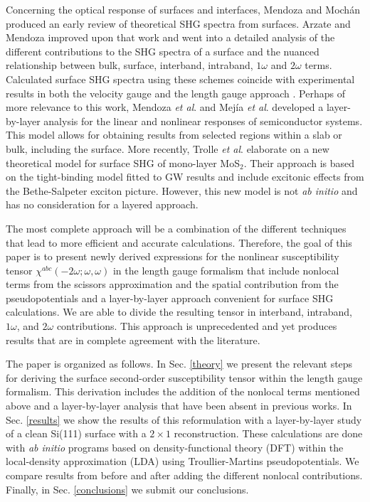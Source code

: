 \documentclass[floatfix,prb,aps,superscriptaddress,11pt,preprint,letterpaper]{revtex4}
\begin{document}
Concerning the optical response of surfaces and interfaces,
Mendoza and Moch\'an\cite{mendozaPRB96a} produced an early review of 
theoretical SHG spectra from surfaces. 
Arzate and Mendoza\cite{arzatePRB01} improved upon that work and
went into a detailed analysis of the different contributions to the 
SHG spectra of a surface and the nuanced relationship between bulk, 
surface, interband, intraband, $1\omega$ and $2\omega$ terms. 
Calculated surface SHG spectra using these schemes coincide with experimental
results in both the velocity gauge
\cite{mendozaPRB01,mendozaPRL98,reiningPRB94} and the length gauge approach
\cite{sharmaPRB03}. 
Perhaps of more relevance to this work, 
Mendoza \emph{et al}.\cite{mendozaPRB06} and 
Mej\'ia \emph{et al}.\cite{mejiaRMF04} developed a layer-by-layer analysis for 
the linear and nonlinear responses of semiconductor systems. This model
allows for obtaining results from selected regions within a slab or bulk,
including the surface.
More recently, 
Trolle \emph{et al}.\cite{trollePRB14} 
elaborate on a new theoretical model for surface SHG of 
mono-layer MoS$_{2}$. Their approach is based on the tight-binding model 
fitted to GW results and include excitonic effects from the 
Bethe-Salpeter exciton picture. However, this new model is not 
\emph{ab initio} and has no consideration for a layered approach.

The most complete approach will be a combination of the different techniques 
that lead to more efficient and accurate calculations. Therefore,
the goal of this paper is to present newly derived expressions for the 
nonlinear susceptibility tensor $\chi^{abc}(-2\omega;\omega,\omega)$ 
in the length gauge formalism
that include nonlocal terms from the scissors approximation 
and the spatial contribution from the pseudopotentials and a 
layer-by-layer approach convenient for surface SHG calculations. We are
able to divide the resulting tensor in interband, intraband, $1\omega$, and 
$2\omega$ contributions. This approach is unprecedented and yet produces 
results that are in complete agreement with the literature.

The paper is organized as follows. 
In Sec. \ref{theory} we present the 
relevant steps for deriving the surface second-order susceptibility tensor 
within the length gauge formalism. This derivation includes the addition of 
the nonlocal terms mentioned above and a layer-by-layer analysis that have 
been absent in previous works. 
In Sec. \ref{results} we show the results of this 
reformulation with a layer-by-layer study of a clean Si(111) surface with a 
$2 \times 1$ reconstruction. These calculations are done with \emph{ab initio}
programs based on density-functional theory (DFT) within the local-density 
approximation (LDA) using Troullier-Martins pseudopotentials. We compare 
results from before and after adding the different nonlocal contributions.
Finally, in Sec. \ref{conclusions} we submit our conclusions.
\end{document}
